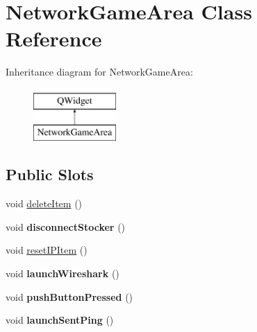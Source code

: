 \hypertarget{class_network_game_area}{\section{Network\-Game\-Area Class Reference}
\label{class_network_game_area}
}
Inheritance diagram for Network\-Game\-Area\-:\begin{figure}[H]
\begin{center}
\leavevmode
\includegraphics[height=2.000000cm]{class_network_game_area}
\end{center}
\end{figure}
\subsection*{Public Slots}
\begin{DoxyCompactItemize}
\item 
void \hyperlink{class_network_game_area_a6159d3a7baee1c9fbae3550bbb706d78}{delete\-Item} ()
\item 
\hypertarget{class_network_game_area_a84c58fd7b5866f2cf55cb3d6b78793be}{void {\bfseries disconnect\-Stocker} ()}\label{class_network_game_area_a84c58fd7b5866f2cf55cb3d6b78793be}

\item 
void \hyperlink{class_network_game_area_ac5dde343bd8a1624a1106617e147528f}{reset\-I\-P\-Item} ()
\item 
\hypertarget{class_network_game_area_a292b44dce9207212dbb5df8b638f7799}{void {\bfseries launch\-Wireshark} ()}\label{class_network_game_area_a292b44dce9207212dbb5df8b638f7799}

\item 
\hypertarget{class_network_game_area_aae9efafa9d68df2462442f58605942c4}{void {\bfseries push\-Button\-Pressed} ()}\label{class_network_game_area_aae9efafa9d68df2462442f58605942c4}

\item 
\hypertarget{class_network_game_area_a12a090fe82575d32eba2f3e94ea52b38}{void {\bfseries launch\-Sent\-Ping} ()}\label{class_network_game_area_a12a090fe82575d32eba2f3e94ea52b38}

\end{DoxyCompactItemize}
